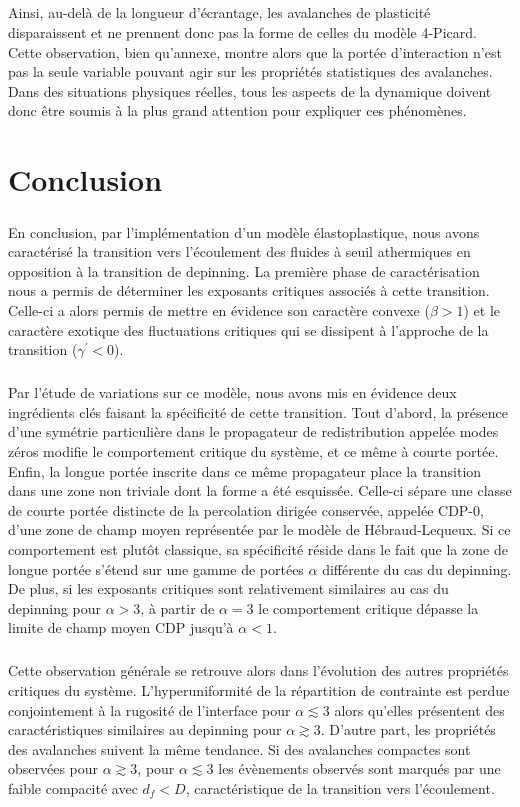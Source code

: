 \subparagraph{}Ainsi, au-delà de la longueur d'écrantage, les avalanches de plasticité disparaissent et ne prennent donc pas la forme de celles du modèle 4-Picard. Cette observation, bien qu'annexe, montre alors que la portée d'interaction n'est pas la seule variable pouvant agir sur les propriétés statistiques des avalanches. Dans des situations physiques réelles, tous les aspects de la dynamique doivent donc être soumis à la plus grand attention pour expliquer ces phénomènes.

\section{Conclusion}

\subparagraph{}En conclusion, par l'implémentation d'un modèle élastoplastique, nous avons caractérisé la transition vers l'écoulement des fluides à seuil athermiques en opposition à la transition de depinning. La première phase de caractérisation nous a permis de déterminer les exposants critiques associés à cette transition. Celle-ci a alors permis de mettre en évidence son caractère convexe ($\beta >1$) et le caractère exotique des fluctuations critiques qui se dissipent à l'approche de la transition ($\gamma^\prime<0$). 

\subparagraph{}Par l'étude de variations sur ce modèle, nous avons mis en évidence deux ingrédients clés faisant la spécificité de cette transition. Tout d'abord, la présence d'une symétrie particulière dans le propagateur de redistribution appelée modes zéros modifie le comportement critique du système, et ce même à courte portée. Enfin, la longue portée inscrite dans ce même propagateur place la transition dans une zone non triviale dont la forme a été esquissée. Celle-ci sépare une classe de courte portée distincte de la percolation dirigée conservée, appelée CDP-0, d'une zone de champ moyen représentée par le modèle de Hébraud-Lequeux. Si ce comportement est plutôt classique, sa spécificité réside dans le fait que la zone de longue portée s'étend sur une gamme de portées $\alpha$ différente du cas du depinning. De plus, si les exposants critiques sont relativement similaires au cas du depinning pour $\alpha>3$, à partir de $\alpha=3$ le comportement critique dépasse la limite de champ moyen CDP jusqu'à $\alpha<1$.

\subparagraph{}Cette observation générale se retrouve alors dans l'évolution des autres propriétés critiques du système. L'hyperuniformité de la répartition de contrainte est perdue conjointement à la rugosité de l'interface pour $\alpha\lesssim 3$ alors qu'elles présentent des caractéristiques similaires au depinning pour $\alpha\gtrsim 3$. D'autre part, les propriétés des avalanches suivent la même tendance. Si des avalanches compactes sont observées pour $\alpha\gtrsim 3$, pour $\alpha\lesssim 3$ les évènements observés sont marqués par une faible compacité avec $d_f < D$, caractéristique de la transition vers l'écoulement. 

